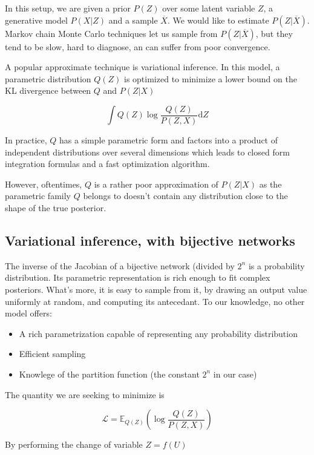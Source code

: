 \documentclass{article}
\begin{document}
In this setup, we are given a prior \(P(Z)\) over some latent variable \(Z\),
a generative model \(P(X | Z)\) and a sample \(\overline{X}\). We would like to
estimate \(P(Z | \overline{X})\). Markov chain Monte Carlo techniques let us
sample from \(P(Z | \overline{X})\), but they tend to be slow,
hard to diagnose, an can suffer from poor convergence.

A popular approximate technique is variational inference. In this model, a
parametric distribution \(Q(Z)\) is optimized to minimize a lower bound
on the KL divergence between \(Q\) and \(P(Z | X)\)

\[
  \int Q(Z) \log \frac{Q(Z)}{P(Z, X)} \mathrm{d}Z
\]

In practice, \(Q\) has a simple parametric form and factors into a product
of independent distributions over several dimensions which leads to closed
form integration formulas and a fast optimization algorithm.

However, oftentimes, \(Q\) is a rather poor approximation of
\(P(Z | X)\) as the parametric family \(Q\) belongs to doesn't contain
any distribution close to the shape of the true posterior.

\subsection{Variational inference, with bijective networks}

The inverse of the Jacobian of a bijective network (divided by \(2^n\)
is a probability distribution. Its parametric representation is rich
enough to fit complex posteriors. What's more, it is easy to sample from it,
by drawing an output value uniformly at random, and computing its antecedant.
To our knowledge, no other model offers:

\begin{itemize}
\item A rich parametrization capable of representing any probability distribution
\item Efficient sampling
\item Knowlege of the partition function (the constant \(2^n\) in our case)
\end{itemize}

The quantity we are seeking to minimize is

\[
  \mathcal{L} = \mathbb{E}_{Q(Z)} \left(\log \frac{Q(Z)}{P(Z,X)} \right)
\]

By performing the change of variable $Z = f(U)$
\end{document}
